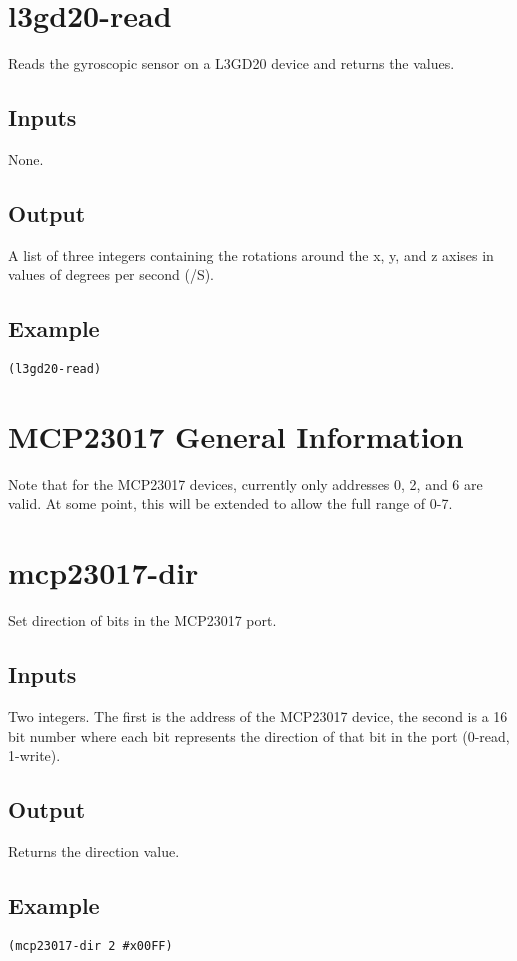 \documentclass[10pt, openany]{book}
\begin{document}
\section{l3gd20-read}
Reads the gyroscopic sensor on a L3GD20 device and returns the values.
\subsection{Inputs}
None.
\subsection{Output}
A list of three integers containing the rotations around the x, y, and z axises in values of degrees per second (\degree/S).
\subsection{Example}
\begin{lstlisting}
(l3gd20-read)
\end{lstlisting}

\section{MCP23017 General Information}
Note that for the MCP23017 devices, currently only addresses 0, 2, and 6 are valid.  At some point, this will be extended to allow the full range of 0-7.

\section{mcp23017-dir}
Set direction of bits in the MCP23017 port.
\subsection{Inputs}
Two integers.  The first is the address of the MCP23017 device, the second is a 16 bit number where each bit represents the direction of that bit in the port (0-read, 1-write).
\subsection{Output}
Returns the direction value.
\subsection{Example}
\begin{lstlisting}
(mcp23017-dir 2 #x00FF)
\end{lstlisting}
\end{document}
